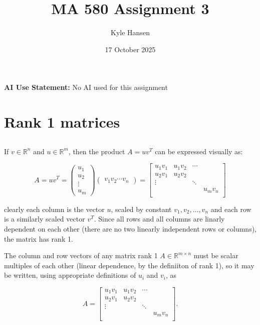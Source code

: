 \documentclass{template}
\title{MA 580 Assignment 3}
\author{Kyle Hansen}
\date{17 October 2025}
\begin{document}
\maketitle

\textbf{AI Use Statement: }No AI used for this assignment


\section{Rank 1 matrices}

\subsection{}

If $v \in \mathbb{R}^n$ and $u \in \mathbb{R}^m$, then the product $A = uv^T$ can be expressed visually as:

\begin{equation}\label{eq:first-statement}
  A = uv^T = \begin{pmatrix}
            u_1\\
            u_2\\
            \vdots \\
            u_m\end{pmatrix} \begin{pmatrix}
              v_1 v_2 \cdots v_n
  \end{pmatrix} = 
  \begin{bmatrix}
    u_1v_1 & u_1v_2 & \cdots &   \\
    u_2v_1 & u_2v_2 &  &  \\
    \vdots  &  &  \ddots  &  \\
      &  & &  u_mv_n  \\
  \end{bmatrix}
\end{equation}

clearly each column is the vector $u$, scaled by constant $v_1, v_2, \dots, v_n$ and each row is a similarly scaled vector $v^T$. Since all rows and all columns are linarly dependent on each other (there are no two linearly independent rows or columns), the matrix has rank 1.

The column and row vectors of any matrix rank 1 $A \in \mathbb{R}^{m\times n}$ must be scalar multiples of each other (linear dependence, by the definiiton of rank 1), so it may be written, using appropriate definitions of $u_i$ and $v_i$, as

\begin{equation}
  A = \begin{bmatrix}
    u_1v_1 & u_1v_2 & \cdots &   \\
    u_2v_1 & u_2v_2 &  &  \\
    \vdots  &  &  \ddots  &  \\
      &  & &  u_mv_n  \\
  \end{bmatrix}.
\end{equation}
\end{document}
